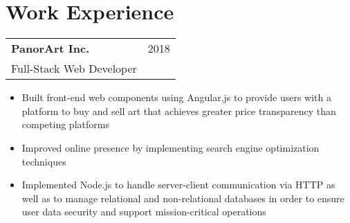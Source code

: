 \documentclass[letterpaper, 12pt]{article}
\begin{document}
\section{Work Experience}
\begin{tabular}{@{} L{12cm} @{} R{4.51cm} @{}}
  \textbf{PanorArt Inc.} & 2018 \\
  Full-Stack Web Developer\\
\end{tabular}
\begin{itemize}
  \item Built front-end web components using Angular.js to provide users with a platform to buy and sell art that achieves greater price transparency than competing platforms
  \item Improved online presence by implementing search engine optimization techniques
  \item Implemented Node.js to handle server-client communication via HTTP as well as to manage relational and non-relational databases in order to ensure user data security and support mission-critical operations
\end{itemize}
\end{document}

